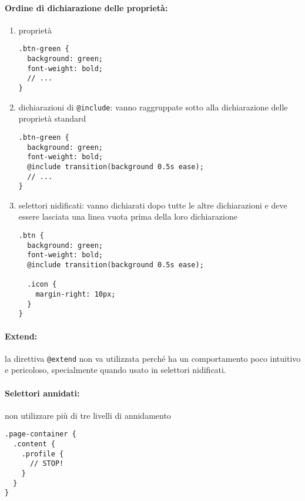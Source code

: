 \documentclass[../ProcessiPrimari.tex]{subfiles}
\begin{document}
\paragraph*{Ordine di dichiarazione delle proprietà:}
\begin{enumerate}
	\item proprietà
\begin{center}{
\begin{minipage}{5cm}
\begin{Verbatim}[frame=single]
.btn-green {
  background: green;
  font-weight: bold;
  // ...
}
\end{Verbatim}
\end{minipage}
}
\end{center}
	\item dichiarazioni di \texttt{@include}: vanno raggruppate sotto alla dichiarazione delle proprietà standard
\begin{center}{
\begin{minipage}{10cm}
\begin{Verbatim}[frame=single]
.btn-green {
  background: green;
  font-weight: bold;
  @include transition(background 0.5s ease);
  // ...
}
\end{Verbatim}
\end{minipage}
}
\end{center}
\item selettori nidificati: vanno dichiarati dopo tutte le altre dichiarazioni e deve essere lasciata una linea vuota prima della loro dichiarazione
\begin{center}{
\begin{minipage}{10cm}
\begin{Verbatim}[frame=single]
.btn {
  background: green;
  font-weight: bold;
  @include transition(background 0.5s ease);

  .icon {
    margin-right: 10px;
  }
}
\end{Verbatim}
\end{minipage}
}
\end{center}
\end{enumerate}
\paragraph*{Extend: }
la direttiva \texttt{@extend} non va utilizzata perché ha un comportamento poco intuitivo e pericoloso, specialmente quando usato in selettori nidificati.
\paragraph*{Selettori annidati: }
non utilizzare più di tre livelli di annidamento
\begin{center}{
\begin{minipage}{5cm}
\begin{Verbatim}[frame=single]
.page-container {
  .content {
    .profile {
      // STOP!
    }
  }
}
\end{Verbatim}
\end{minipage}
}
\end{center}

	
\end{document}

